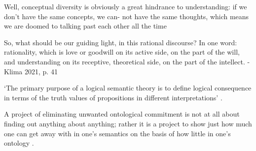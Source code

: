 \documentclass[]{article}
\begin{document}
Well, conceptual diversity is obviously
a great hindrance to understanding: if we don’t have the same concepts, we can-
not have the same thoughts, which means we are doomed to talking past each
other all the time\autocite[36]{Klima2021}

So, what should be our guiding light, in this rational discourse? In one word:
rationality, which is love or goodwill on its active side, on the part of the will, and
understanding on its receptive, theoretical side, on the part of the intellect. -Klima 2021, p. 41
\autocite{Parsons2014,Read2015b}

`The primary purpose of a logical semantic theory is to define logical consequence in terms of the truth values of propositions in different interpretations' \autocite[79]{Klima1991b}. 

A project of eliminating unwanted
ontological commitment is not at all about finding out anything about anything;
rather it is a project to show just how much one can get away with in one’s
semantics on the basis of how little in one’s ontology \autocite[412]{Klima2012}.

\printbibliography
\end{document}
